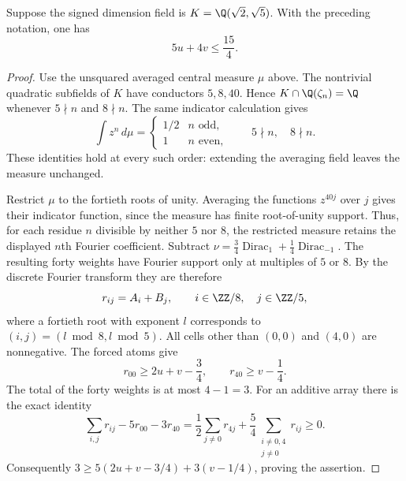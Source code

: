 \begin{lemma}\label{core:lem:sqrt5-periodic-moments}
Suppose the signed dimension field is $K=\Q(\sqrt2,\sqrt5)$.
With the preceding notation, one has
\[
 5u+4v\le\frac{15}{4}.
\]
\end{lemma}
\begin{proof}
Use the unsquared averaged central measure $\mu$ above.
The nontrivial quadratic subfields of $K$ have conductors $5,8,40$.
Hence $K\cap\Q(\zeta_n)=\Q$ whenever $5\nmid n$ and
$8\nmid n$. The same indicator calculation gives
\[
 \int z^n\,d\mu=\begin{cases}1/2&n\text{ odd},\\1&n\text{ even},\end{cases}
 \qquad 5\nmid n,\quad8\nmid n.
\]
These identities hold at every such order: extending the averaging
field leaves the measure unchanged.

Restrict $\mu$ to the fortieth roots of unity. Averaging the functions
$z^{40j}$ over $j$ gives their indicator function, since the measure
has finite root-of-unity support. Thus, for each residue $n$ divisible
by neither $5$ nor $8$, the restricted measure retains the displayed
$n$th Fourier coefficient. Subtract
$\nu=\tfrac34\operatorname{Dirac}_1+\tfrac14\operatorname{Dirac}_{-1}$.
The resulting forty weights have Fourier support only at multiples
of $5$ or $8$. By the discrete Fourier transform they are therefore
\[
 r_{ij}=A_i+B_j,\qquad i\in\ZZ/8,\quad j\in\ZZ/5,
\]
where a fortieth root with exponent $l$ corresponds to
$(i,j)=(l\bmod8,l\bmod5)$.
All cells other than $(0,0)$ and $(4,0)$ are nonnegative. The forced
atoms give
\[
 r_{00}\ge2u+v-\frac34,\qquad
 r_{40}\ge v-\frac14.
\]
The total of the forty weights is at most $4-1=3$.
For an additive array there is the exact identity
\[
 \sum_{i,j}r_{ij}-5r_{00}-3r_{40}
 =\frac12\sum_{j\ne0}r_{4j}
  +\frac54\sum_{\substack{i\ne0,4\\j\ne0}}r_{ij}\ge0.
\]
Consequently
$3\ge5(2u+v-3/4)+3(v-1/4)$, proving the assertion.
\end{proof}
